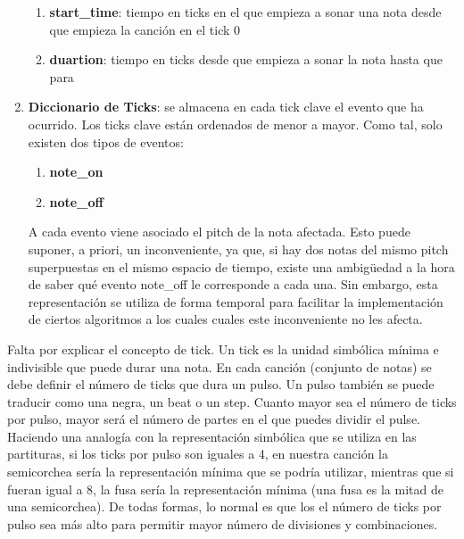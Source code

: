 \begin{enumerate}
\begin{enumerate}
        \item[\textbullet] \textbf{start\_time}: tiempo en ticks en el que empieza a sonar una nota desde que empieza la canción en el tick 0
        \item[\textbullet] \textbf{duartion}: tiempo en ticks desde que empieza a sonar la nota hasta que para
    \end{enumerate}
    \item \textbf{Diccionario de Ticks}: se almacena en cada tick clave el evento que ha ocurrido. Los ticks clave están ordenados de menor a mayor. Como tal, solo existen dos tipos de eventos: 
    \begin{enumerate}
        \item[\textbullet] \textbf{note\_on}
        \item[\textbullet] \textbf{note\_off}
    \end{enumerate}
    A cada evento viene asociado el pitch de la nota afectada. Esto puede suponer, a priori, un inconveniente, ya que, si hay dos notas del mismo pitch superpuestas en el mismo espacio de tiempo, existe una ambigüedad a la hora de saber qué evento note\_off le corresponde a cada una. Sin embargo, esta representación se utiliza de forma temporal para facilitar la implementación de ciertos algoritmos a los cuales cuales este inconveniente no les afecta. 
    
\end{enumerate}

    Falta por explicar el concepto de tick. Un tick es la unidad simbólica mínima e indivisible que puede durar una nota. En cada canción (conjunto de notas) se debe definir el número de ticks que dura un pulso. Un pulso también se puede traducir como una negra, un beat o un step. Cuanto mayor sea el número de ticks por pulso, mayor será el número de partes en el que puedes dividir el pulse. Haciendo una analogía con la representación simbólica que se utiliza en las partituras, si los ticks por pulso son iguales a 4, en nuestra canción la semicorchea sería la representación mínima que se podría utilizar, mientras que si fueran igual a 8, la fusa sería la representación mínima (una fusa es la mitad de una semicorchea). De todas formas, lo normal es que los el número de ticks por pulso sea más alto para permitir mayor número de divisiones y combinaciones.

    


    
